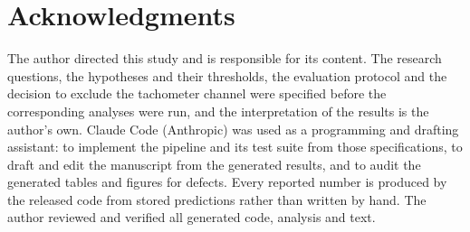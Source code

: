 \documentclass[conference]{IEEEtran}
\begin{document}
\section*{Acknowledgments}
%

The author directed this study and is responsible for its content. The
research questions, the hypotheses and their thresholds, the evaluation
protocol and the decision to exclude the tachometer channel were specified
before the corresponding analyses were run, and the interpretation of the
results is the author's own. Claude Code (Anthropic) was used as a
programming and drafting assistant: to implement the pipeline and its test
suite from those specifications, to draft and edit the manuscript from the
generated results, and to audit the generated tables and figures for
defects. Every reported number is produced by the released code from
stored predictions rather than written by hand. The author reviewed and
verified all generated code, analysis and text.



\end{document}
